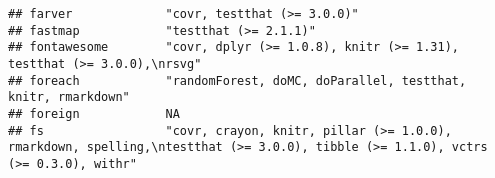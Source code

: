 \documentclass[
]{article}
\begin{document}
\begin{verbatim}
## farver             "covr, testthat (>= 3.0.0)"                                                                                                                                                                                                                                                                                                                                                                                                                                                       
## fastmap            "testthat (>= 2.1.1)"                                                                                                                                                                                                                                                                                                                                                                                                                                                             
## fontawesome        "covr, dplyr (>= 1.0.8), knitr (>= 1.31), testthat (>= 3.0.0),\nrsvg"                                                                                                                                                                                                                                                                                                                                                                                                             
## foreach            "randomForest, doMC, doParallel, testthat, knitr, rmarkdown"                                                                                                                                                                                                                                                                                                                                                                                                                      
## foreign            NA                                                                                                                                                                                                                                                                                                                                                                                                                                                                                
## fs                 "covr, crayon, knitr, pillar (>= 1.0.0), rmarkdown, spelling,\ntestthat (>= 3.0.0), tibble (>= 1.1.0), vctrs (>= 0.3.0), withr"                                                                                                                                                                                                                                                                                                                                                   

\end{verbatim}
\end{document}
